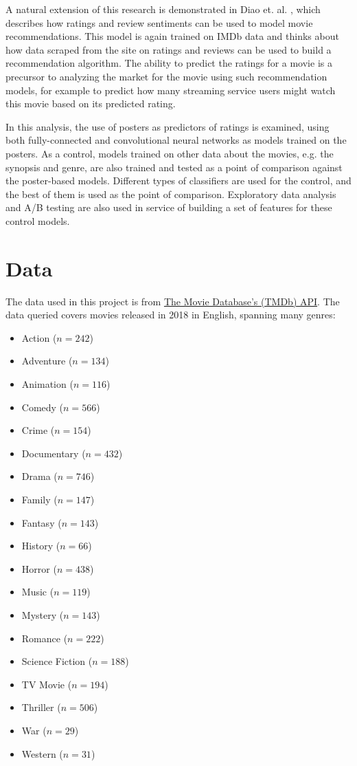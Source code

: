 \documentclass[12pt, oneside]{article}   	%
\begin{document}
A natural extension of this research is demonstrated in Diao et. al. \cite{diao_jointly_2014}, which describes how ratings and review sentiments can be used to model movie recommendations. This model is again trained on IMDb data and thinks about how data scraped from the site on ratings and reviews can be used to build a recommendation algorithm. The ability to predict the ratings for a movie is a precursor to analyzing the market for the movie using such recommendation models, for example to predict how many streaming service users might watch this movie based on its predicted rating. 

In this analysis, the use of posters as predictors of ratings is examined, using both fully-connected and convolutional neural networks as models trained on the posters. As a control, models trained on other data about the movies, e.g. the synopsis and genre, are also trained and tested as a point of comparison against the poster-based models. Different types of classifiers are used for the control, and the best of them is used as the point of comparison. Exploratory data analysis and A/B testing are also used in service of building a set of features for these control models.

\section{Data}

The data used in this project is from \href{https://api.tmdb.org}{The Movie Database's (TMDb) API}. The data queried covers movies released in 2018 in English, spanning many genres: 

\begin{itemize}
\item Action ($n=242$)
\item Adventure ($n=134$)
\item Animation ($n=116$)
\item Comedy ($n=566$)
\item Crime ($n=154$)
\item Documentary ($n=432$)
\item Drama ($n=746$)
\item Family ($n=147$)
\item Fantasy ($n=143$)
\item History ($n=66$)
\item Horror ($n=438$)
\item Music ($n=119$)
\item Mystery ($n=143$)
\item Romance ($n=222$)
\item Science Fiction ($n=188$)
\item TV Movie ($n=194$)
\item Thriller ($n=506$)
\item War ($n=29$)
\item Western ($n=31$)
\end{itemize}
\end{document}
